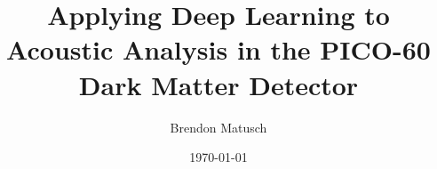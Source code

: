 \documentclass[12pt]{article}
\begin{document}
\title{Applying Deep Learning to Acoustic Analysis in the PICO-60 Dark Matter Detector}
\author{Brendon Matusch}
\date{\today}
\maketitle
\end{document}
